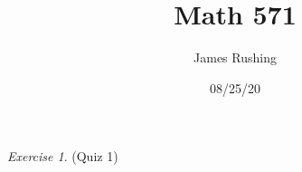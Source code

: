 \documentclass[12pt,oneside]{amsart}
\title{Math 571}
\author{James Rushing}
\date{08/25/20}
\theoremstyle{definition}
\theoremstyle{remark}
\newtheorem{exer}{Exercise}
\numberwithin{equation}{exer}
\begin{document}
\maketitle

\begin{exer} (Quiz 1)
    
\end{exer}
\end{document}
